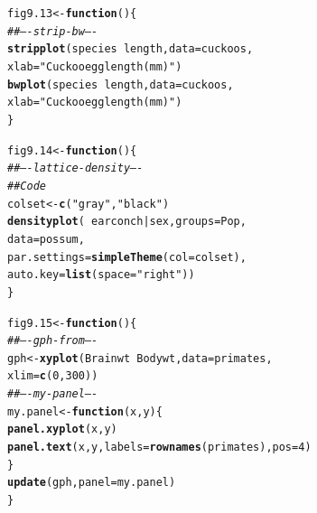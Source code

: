 \documentclass[12pt, a4paper,  BCOR=8.25mm, DIV=15]{scrartcl}\usepackage[]{graphicx}\usepackage[]{color}
\makeatletter
\newcommand{\hlnum}[1]{\textcolor[rgb]{0.686,0.059,0.569}{#1}}%
\newcommand{\hlstr}[1]{\textcolor[rgb]{0.192,0.494,0.8}{#1}}%
\newcommand{\hlcom}[1]{\textcolor[rgb]{0.678,0.584,0.686}{\textit{#1}}}%
\newcommand{\hlopt}[1]{\textcolor[rgb]{0,0,0}{#1}}%
\newcommand{\hlstd}[1]{\textcolor[rgb]{0.345,0.345,0.345}{#1}}%
\newcommand{\hlkwa}[1]{\textcolor[rgb]{0.161,0.373,0.58}{\textbf{#1}}}%
\newcommand{\hlkwb}[1]{\textcolor[rgb]{0.69,0.353,0.396}{#1}}%
\newcommand{\hlkwc}[1]{\textcolor[rgb]{0.333,0.667,0.333}{#1}}%
\newcommand{\hlkwd}[1]{\textcolor[rgb]{0.737,0.353,0.396}{\textbf{#1}}}%
\newenvironment{kframe}{%
 \def\at@end@of@kframe{}%
 \ifinner\ifhmode%
  \def\at@end@of@kframe{\end{minipage}}%
  \begin{minipage}{\columnwidth}%
 \fi\fi%
 \def\FrameCommand##1{\hskip\@totalleftmargin \hskip-\fboxsep
 \colorbox{shadecolor}{##1}\hskip-\fboxsep
     \hskip-\linewidth \hskip-\@totalleftmargin \hskip\columnwidth}%
 \MakeFramed {\advance\hsize-\width
   \@totalleftmargin\z@ \linewidth\hsize
   \@setminipage}}%
 {\par\unskip\endMakeFramed%
 \at@end@of@kframe}
\newenvironment{knitrout}{}{} %
\makeatother
\begin{document}
\begin{knitrout}
\color{fgcolor}\begin{kframe}
\begin{alltt}
\hlstd{fig9.13} \hlkwb{<-} \hlkwa{function}\hlstd{()\{}
\hlcom{## ---- strip-bw ----}
\hlkwd{stripplot}\hlstd{(species} \hlopt{~} \hlstd{length,} \hlkwc{data}\hlstd{=cuckoos,}
          \hlkwc{xlab}\hlstd{=}\hlstr{"Cuckoo egg length (mm)"}\hlstd{)}
\hlkwd{bwplot}\hlstd{(species} \hlopt{~} \hlstd{length,} \hlkwc{data}\hlstd{=cuckoos,}
       \hlkwc{xlab}\hlstd{=}\hlstr{"Cuckoo egg length (mm)"}\hlstd{)}
\hlstd{\}}
\end{alltt}
\end{kframe}
\end{knitrout}

\begin{knitrout}
\color{fgcolor}\begin{kframe}
\begin{alltt}
\hlstd{fig9.14} \hlkwb{<-} \hlkwa{function}\hlstd{()\{}
\hlcom{## ---- lattice-density ----}
\hlcom{## Code}
\hlstd{colset} \hlkwb{<-} \hlkwd{c}\hlstd{(}\hlstr{"gray"}\hlstd{,}\hlstr{"black"}\hlstd{)}
\hlkwd{densityplot}\hlstd{(}\hlopt{~} \hlstd{earconch} \hlopt{|} \hlstd{sex,} \hlkwc{groups}\hlstd{=Pop,}
            \hlkwc{data}\hlstd{=possum,}
            \hlkwc{par.settings}\hlstd{=}\hlkwd{simpleTheme}\hlstd{(}\hlkwc{col}\hlstd{=colset),}
            \hlkwc{auto.key}\hlstd{=}\hlkwd{list}\hlstd{(}\hlkwc{space}\hlstd{=}\hlstr{"right"}\hlstd{))}
\hlstd{\}}
\end{alltt}
\end{kframe}
\end{knitrout}

\begin{knitrout}
\color{fgcolor}\begin{kframe}
\begin{alltt}
\hlstd{fig9.15} \hlkwb{<-} \hlkwa{function}\hlstd{()\{}
\hlcom{## ---- gph-from ----}
\hlstd{gph} \hlkwb{<-} \hlkwd{xyplot}\hlstd{(Brainwt} \hlopt{~} \hlstd{Bodywt,}  \hlkwc{data}\hlstd{=primates,}
              \hlkwc{xlim}\hlstd{=}\hlkwd{c}\hlstd{(}\hlnum{0}\hlstd{,}\hlnum{300}\hlstd{))}
\hlcom{## ---- my-panel ----}
\hlstd{my.panel} \hlkwb{<-} \hlkwa{function}\hlstd{(}\hlkwc{x}\hlstd{,}\hlkwc{y}\hlstd{)\{}
  \hlkwd{panel.xyplot}\hlstd{(x,y)}
  \hlkwd{panel.text}\hlstd{(x,y,} \hlkwc{labels}\hlstd{=}\hlkwd{rownames}\hlstd{(primates),} \hlkwc{pos}\hlstd{=}\hlnum{4}\hlstd{)}
\hlstd{\}}
\hlkwd{update}\hlstd{(gph,} \hlkwc{panel}\hlstd{=my.panel)}
\hlstd{\}}
\end{alltt}
\end{kframe}
\end{knitrout}
\end{document}
